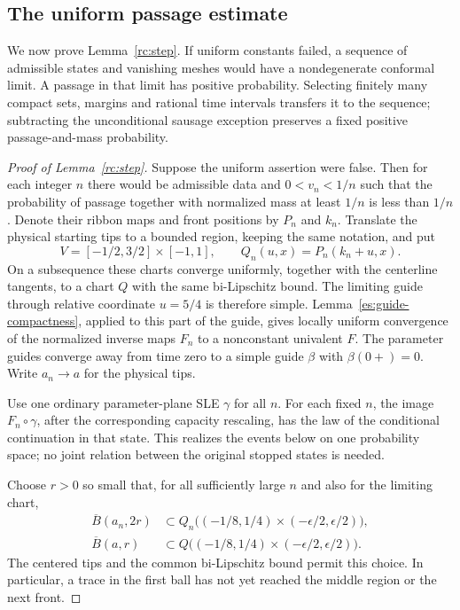 \documentclass[11pt]{article}
\theoremstyle{definition}
\theoremstyle{remark}
\numberwithin{equation}{section}
\begin{document}
\subsection{The uniform passage estimate}

We now prove Lemma~\ref{rc:step}. If uniform constants failed,
a sequence of admissible states and vanishing meshes would have a
nondegenerate conformal limit. A passage in that limit has positive
probability. Selecting finitely many compact sets, margins and
rational time intervals transfers it to the sequence; subtracting
the unconditional sausage exception preserves a fixed positive
passage-and-mass probability.




\begin{proof}[Proof of Lemma~\ref{rc:step}]
Suppose the uniform assertion were false.  Then for each integer $n$
there would be admissible data and $0<v_n<1/n$ such that the probability
of passage together with normalized mass at least $1/n$ is less than
$1/n$.  Denote their ribbon maps and front positions by $P_n$ and
$k_n$. Translate the physical starting tips to a bounded region, keeping
the same notation, and put
\[
 V=[-1/2,3/2]\times[-1,1],\qquad Q_n(u,x)=P_n(k_n+u,x).
\]
On a subsequence these charts converge uniformly, together with the
centerline tangents, to a chart $Q$ with the same bi-Lipschitz bound.
The limiting guide through relative coordinate $u=5/4$ is therefore
simple. Lemma~\ref{es:guide-compactness}, applied to this part of the
guide, gives locally uniform convergence of the normalized inverse maps
$F_n$ to a nonconstant univalent $F$. The parameter guides converge away
from time zero to a simple guide $\beta$ with $\beta(0+)=0$. Write
$a_n\to a$ for the physical tips.

Use one ordinary parameter-plane SLE $\gamma$ for all $n$. For each
fixed $n$, the image $F_n\circ\gamma$, after the corresponding capacity
rescaling, has the law of the conditional continuation in that state.
This realizes the events below on one probability space; no joint
relation between the original stopped states is needed.

Choose $r>0$ so small that, for all sufficiently large $n$ and also for
the limiting chart,
\[
 \begin{aligned}
 \overline B(a_n,2r)&\subset
 Q_n\bigl((-1/8,1/4)\times(-\epsilon/2,\epsilon/2)\bigr),\\
 \overline B(a,r)&\subset
 Q\bigl((-1/8,1/4)\times(-\epsilon/2,\epsilon/2)\bigr).
 \end{aligned}
\]
The centered tips and the common bi-Lipschitz bound permit this choice.
In particular, a trace in the first ball has not yet reached the middle
region or the next front.


\end{proof}
\end{document}
